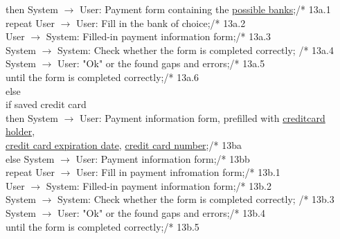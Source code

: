 then System $\rightarrow$ User: Payment form containing the \underline{possible banks};\hfill /* 13a.1\\
\phantom{x}\hspace{7mm} repeat User $\rightarrow$ User: Fill in the bank of choice;\hfill /* 13a.2\\
\phantom{x}\hspace{14mm} User $\rightarrow$ System: Filled-in payment information form;\hfill /* 13a.3\\
\phantom{x}\hspace{14mm} System $\rightarrow$ System: Check whether the form is completed correctly; \hfill /* 13a.4\\
\phantom{x}\hspace{14mm} System $\rightarrow$ User: "Ok" or the found gaps and errors;\hfill /* 13a.5\\
\phantom{x}\hspace{7mm} until the form is completed correctly;\hfill /* 13a.6\\
else\\
\phantom{x}\hspace{7mm} if saved credit card\\
\phantom{x}\hspace{7mm} then System $\rightarrow$ User: Payment information form, prefilled with \underline{creditcard holder},\\ \underline{credit card expiration date}, \underline{credit card number};\hfill /* 13ba\\
\phantom{x}\hspace{7mm} else System $\rightarrow$ User: Payment information form;\hfill /* 13bb\\
\phantom{x}\hspace{14mm} repeat User $\rightarrow$ User: Fill in payment infromation form;\hfill /* 13b.1\\
\phantom{x}\hspace{21mm} User $\rightarrow$ System: Filled-in payment information form;\hfill /* 13b.2\\
\phantom{x}\hspace{21mm} System $\rightarrow$ System: Check whether the form is completed correctly; \hfill /* 13b.3\\
\phantom{x}\hspace{21mm} System $\rightarrow$ User: "Ok" or the found gaps and errors;\hfill /* 13b.4\\
\phantom{x}\hspace{14mm} until the form is completed correctly;\hfill /* 13b.5\\

